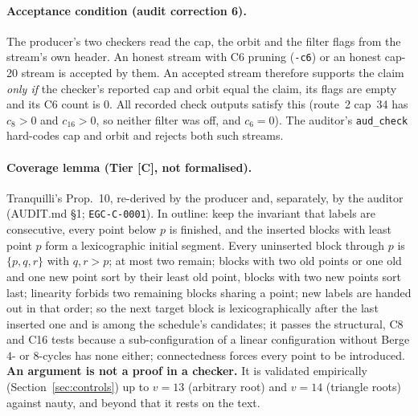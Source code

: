 \documentclass[10pt]{article}
\newcommand{\tier}[1]{\textsf{[#1]}}
\newcommand{\tC}{\tier{C}}
\begin{document}
\paragraph{Acceptance condition (audit correction 6).} The producer's two checkers read the cap, the orbit and the filter flags from the stream's own header. An honest stream with C6 pruning (\texttt{-c6}) or an honest cap-20 stream is accepted by them. An accepted stream therefore supports the claim \emph{only if} the checker's reported cap and orbit equal the claim, its flags are empty and its C6 count is $0$. All recorded check outputs satisfy this (route~2 cap~34 has $c_8>0$ and $c_{16}>0$, so neither filter was off, and $c_6=0$). The auditor's \texttt{aud\_check} hard-codes cap and orbit and rejects both such streams.
\paragraph{Coverage lemma (Tier \tC{}, not formalised).} Tranquilli's Prop.~10, re-derived by the producer and, separately, by the auditor (AUDIT.md \S1; \texttt{EGC-C-0001}). In outline: keep the invariant that labels are consecutive, every point below $p$ is finished, and the inserted blocks with least point $p$ form a lexicographic initial segment. Every uninserted block through $p$ is $\{p,q,r\}$ with $q,r>p$; at most two remain; blocks with two old points or one old and one new point sort by their least old point, blocks with two new points sort last; linearity forbids two remaining blocks sharing a point; new labels are handed out in that order; so the next target block is lexicographically after the last inserted one and is among the schedule's candidates; it passes the structural, C8 and C16 tests because a sub-configuration of a linear configuration without Berge $4$- or $8$-cycles has none either; connectedness forces every point to be introduced. \textbf{An argument is not a proof in a checker.} It is validated empirically (Section~\ref{sec:controls}) up to $v=13$ (arbitrary root) and $v=14$ (triangle roots) against nauty, and beyond that it rests on the text.

\end{document}
